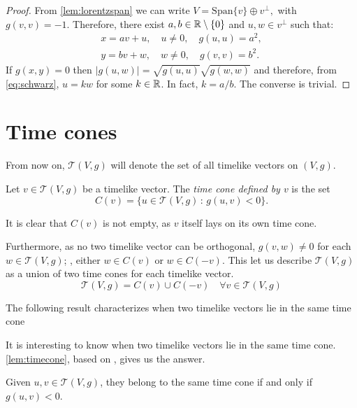\begin{proof}
    From \autoref{lem:lorentzspan} we can write $V=\mathrm{Span}\{v\}\oplus v^{\perp},$ with $g(v,v)=-1$. Therefore, there exist $a,b \in \mathbb{R}\setminus\{0\}$ and $u,w \in v^\perp$ such that:
    \begin{align*}
        x=av+u, \quad u\neq 0, \quad g(u,u)=a^2,\\
        y=bv+w, \quad w\neq 0, \quad g(v,v)=b^2.
    \end{align*}
    If $g(x,y)=0$ then $\lvert g(u,w) \rvert = \sqrt{g(u,u)}\sqrt{g(w,w)}$ and therefore, from \autoref{eq:schwarz}, $u=kw$ for some $k\in \mathbb{R}$. In fact, $k=a/b$. The converse is trivial.
\end{proof}

\section{Time cones}

From now on, $\mathcal{T}(V,g)$ will denote the set of all timelike vectors on $(V,g)$.

\begin{definition}
	Let $v\in \mathcal{T}(V,g)$ be a timelike vector. The \emph{time cone defined by $v$} is the set
	\[
	C(v)=\{u\in\mathcal{T}(V,g)\, : \, g(u,v)<0 \}.
	\]
\end{definition}

It is clear that $C(v)$ is not empty, as $v$ itself lays on its own time cone.

Furthermore, as no two timelike vector can be orthogonal, $g(v,w) \neq 0$ for each $w \in \mathcal{T}(V,g)$; \ie, either $w\in C(v)$ or $w\in C(-v)$. This let us describe $\mathcal{T}(V,g)$ as a union of two time cones for each timelike vector.
\[
\mathcal{T}(V,g) = C(v) \cup C(-v) \quad \forall v\in \mathcal{T}(V,g)
\]

The following result characterizes when two timelike vectors lie in the same time cone 

It is interesting to know when two timelike vectors lie in the same time cone. \autoref{lem:timecone}, based on \cite[Lemma 5.29]{oneill83}, gives us the answer.

\begin{lemma}\label{lem:timecone}
Given $u,v\in \mathcal{T}(V,g)$, they belong to the same time cone if and only if $g(u,v)<0$.
\end{lemma}

